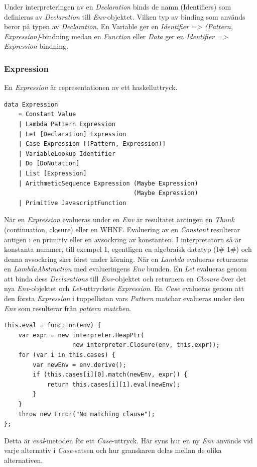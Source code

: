 Under interpreteringen av en \emph{Declaration} binds de namn (Identifiers) som definieras av \emph{Declaration} till \emph{Env}-objektet. Vilken typ av binding som används beror på typen av \emph{Declaration}. En Variable ger en \emph{Identifier => (Pattern, Expression)}-bindning medan en \emph{Function} eller \emph{Data} ger en \emph{Identifier => Expression}-bindning.

\subsubsection{Expression}
En \emph{Expression} är representationen av ett haskelluttryck.

\begin{lstlisting}
data Expression 
    = Constant Value
    | Lambda Pattern Expression
    | Let [Declaration] Expression
    | Case Expression [(Pattern, Expression)]
    | VariableLookup Identifier
    | Do [DoNotation]
    | List [Expression]
    | ArithmeticSequence Expression (Maybe Expression) 
                                    (Maybe Expression)
    | Primitive JavascriptFunction
\end{lstlisting}

När en \emph{Expression} evalueras under en \emph{Env} är resultatet antingen en \emph{Thunk} (continuation, closure) eller en WHNF. Evaluering av en \emph{Constant} resulterar antigen i en primitiv eller en avsockring av konstanten. I interpretatorn så är konstanta nummer, till exempel 1, egentligen en algebraisk datatyp (I\# 1\#) och denna avsockring sker först under körning. När en \emph{Lambda} evalueras returneras en \emph{LambdaAbstraction} med evalueringens \emph{Env} bunden. En \emph{Let} evalueras genom att binda dess \emph{Declarations} till \emph{Env}-objektet och returnera en \emph{Closure} över det nya \emph{Env}-objektet och \emph{Let}-uttryckets \emph{Expression}. En \emph{Case} evalueras genom att den första \emph{Expression} i tuppellistan vars \emph{Pattern} matchar evalueras under den \emph{Env} som resulterar från \emph{pattern matchen}.
\begin{lstlisting}
this.eval = function(env) {
    var expr = new interpreter.HeapPtr(
                   new interpreter.Closure(env, this.expr));
    for (var i in this.cases) {
        var newEnv = env.derive();
        if (this.cases[i][0].match(newEnv, expr)) {
            return this.cases[i][1].eval(newEnv);
        }
    }
    throw new Error("No matching clause");
};
\end{lstlisting}
Detta är \emph{eval}-metoden för ett \emph{Case}-uttryck. Här syns hur en ny \emph{Env} används vid varje alternativ i \emph{Case}-satsen och hur granskaren delas mellan de olika alternativen.

